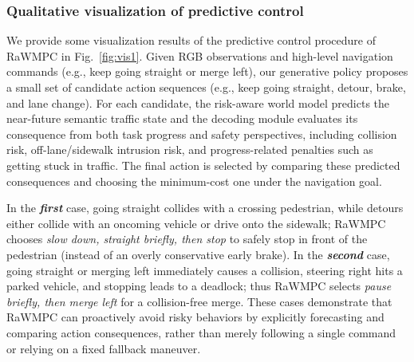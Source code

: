 \documentclass[twocolumn]{template}
\theoremstyle{thmstyleone}%
\theoremstyle{thmstyletwo}%
\theoremstyle{thmstylethree}%
\begin{document}
\subsubsection{Qualitative visualization of predictive control}
We provide some visualization results of the predictive control procedure of RaWMPC in Fig.~\ref{fig:vis1}.
Given RGB observations and high-level navigation commands (e.g., keep going straight or merge left), our generative policy proposes a small set of candidate action sequences (e.g., keep going straight, detour, brake, and lane change).
For each candidate, the risk-aware world model predicts the near-future semantic traffic state and the decoding module evaluates its consequence from both task progress and safety perspectives, including collision risk, off-lane/sidewalk intrusion risk, and progress-related penalties such as getting stuck in traffic.
The final action is selected by comparing these predicted consequences and choosing the minimum-cost one under the navigation goal.



In the \textbf{\textit{first}} case, going straight collides with a crossing pedestrian, while detours either collide with an oncoming vehicle or drive onto the sidewalk; RaWMPC chooses \emph{slow down, straight briefly, then stop} to safely stop in front of the pedestrian (instead of an overly conservative early brake).
In the \textbf{\textit{second}} case, going straight or merging left immediately causes a collision, steering right hits a parked vehicle, and stopping leads to a deadlock; thus RaWMPC selects \emph{pause briefly, then merge left} for a collision-free merge. These cases demonstrate that RaWMPC can proactively avoid risky behaviors by explicitly forecasting and comparing action consequences, rather than merely following a single command or relying on a fixed fallback maneuver.
\end{document}
